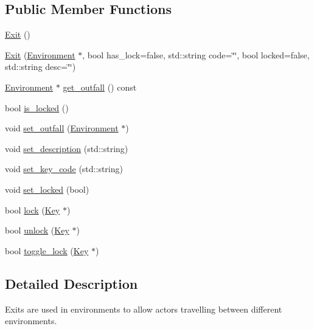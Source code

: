 \subsection*{Public Member Functions}
\begin{DoxyCompactItemize}
\item 
\hyperlink{classda__game_1_1Exit_aaacef438c545390f01c5bf1c6072d43e}{Exit} ()
\item 
\hyperlink{classda__game_1_1Exit_ae6a2d9ab456888b9c5aa7e23539b2827}{Exit} (\hyperlink{classda__game_1_1Environment}{Environment} $\ast$, bool has\_\-lock=false, std::string code=\char`\"{}\char`\"{}, bool locked=false, std::string desc=\char`\"{}\char`\"{})
\item 
\hyperlink{classda__game_1_1Environment}{Environment} $\ast$ \hyperlink{classda__game_1_1Exit_ad4f4951039d5d7ca57fce2120e8390f4}{get\_\-outfall} () const 
\item 
bool \hyperlink{classda__game_1_1Exit_a469187cf61ab5285b71ac4fb103f10b1}{is\_\-locked} ()
\item 
void \hyperlink{classda__game_1_1Exit_ae4f9caa0ac7bf7e09ae1b32fd3f10719}{set\_\-outfall} (\hyperlink{classda__game_1_1Environment}{Environment} $\ast$)
\item 
void \hyperlink{classda__game_1_1Exit_aef620aed29423172be98f0e2bc12db13}{set\_\-description} (std::string)
\item 
void \hyperlink{classda__game_1_1Exit_ad79677f119a5d06a6d4a9185c710ab73}{set\_\-key\_\-code} (std::string)
\item 
void \hyperlink{classda__game_1_1Exit_a48bfb84dc93e05cb9f43d9d87726b8f5}{set\_\-locked} (bool)
\item 
bool \hyperlink{classda__game_1_1Exit_a252eecd61a98bec46db93185745deff5}{lock} (\hyperlink{classda__game_1_1Key}{Key} $\ast$)
\item 
bool \hyperlink{classda__game_1_1Exit_a4e770f624717bb87b2ebd372eb71a09c}{unlock} (\hyperlink{classda__game_1_1Key}{Key} $\ast$)
\item 
bool \hyperlink{classda__game_1_1Exit_a36b7a9235fcb00bf2be0b3fbc5817310}{toggle\_\-lock} (\hyperlink{classda__game_1_1Key}{Key} $\ast$)
\end{DoxyCompactItemize}


\subsection{Detailed Description}
Exits are used in environments to allow actors travelling between different environments. 

